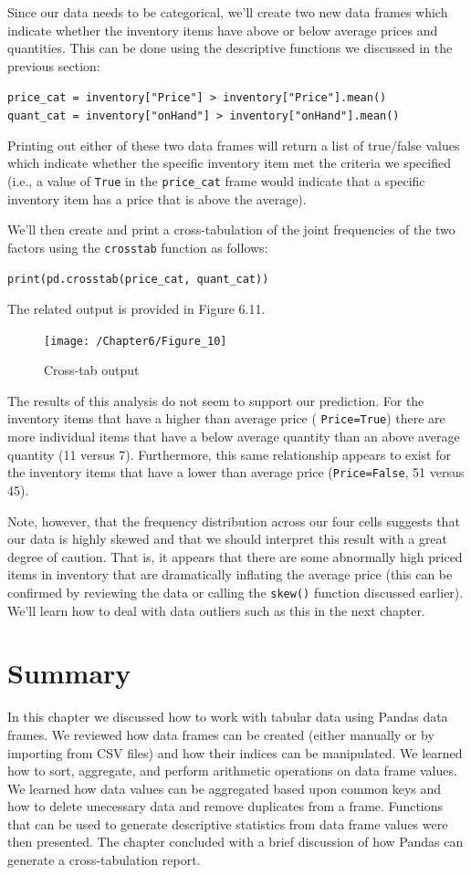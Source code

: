 \documentclass{book}
\begin{document}
Since our data needs to be categorical, we'll create two new data frames which indicate whether the inventory items have above or below average prices and quantities. This can be done using the descriptive functions we discussed in the previous section:

\texttt{price\_cat = inventory["Price"] > inventory["Price"].mean() \\
quant\_cat = inventory["onHand"] > inventory["onHand"].mean()}

Printing out either of these two data frames will return a list of true/false values which indicate whether the specific inventory item met the criteria we specified (i.e., a value of \texttt{True} in the \texttt{price\_cat} frame would indicate that a specific inventory item has a price that is above the average).

We'll then create and print a cross-tabulation of the joint frequencies of the two factors using the \texttt{crosstab} function as follows:

\texttt{print(pd.crosstab(price\_cat, quant\_cat))}

The related output is provided in Figure 6.11.

\begin{figure}[h]
	\caption{Cross-tab output}
	\centering\texttt{[image: /Chapter6/Figure\_10]}
\end{figure}

The results of this analysis do not seem to support our prediction. For the inventory items that have a higher than average price (
\texttt{Price=True}) there are more individual items that have a below average quantity than an above average quantity (11 versus 7). Furthermore, this same relationship appears to exist for the inventory items that have a lower than average price (\texttt{Price=False}, 51 versus 45).

Note, however, that the frequency distribution across our four cells suggests that our data is highly skewed and that we should interpret this result with a great degree of caution. That is, it appears that there are some abnormally high priced items in inventory that are dramatically inflating the average price (this can be confirmed by reviewing the data or calling the \texttt{skew()} function discussed earlier). We'll learn how to deal with data outliers such as this in the next chapter.

\section{Summary}
In this chapter we discussed how to work with tabular data using Pandas data frames. We reviewed how data frames can be created (either manually or by importing from CSV files) and how their indices can be manipulated. We learned how to sort, aggregate, and perform arithmetic operations on data frame values. We learned how data values can be aggregated based upon common keys and how to delete unecessary data and remove duplicates from a frame. Functions that can be used to generate descriptive statistics from data frame values were then presented. The chapter concluded with a brief discussion of how Pandas can generate a cross-tabulation report.
\end{document}
